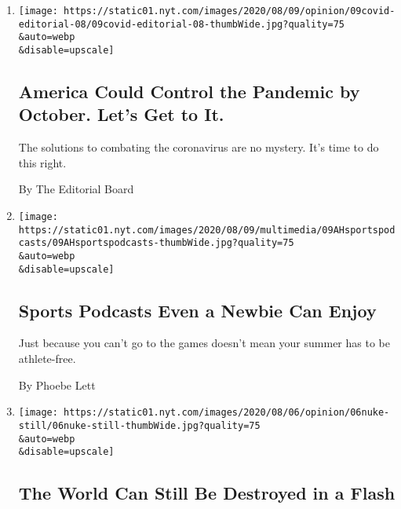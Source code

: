 \begin{enumerate}
\def\labelenumi{\arabic{enumi}.}
\item
  \href{/2020/08/08/opinion/sunday/coronavirus-response-testing-lockdown.html}{}

  \texttt{[image: https://static01.nyt.com/images/2020/08/09/opinion/09covid-editorial-08/09covid-editorial-08-thumbWide.jpg?quality=75\\\&auto=webp\\\&disable=upscale]}

  \hypertarget{america-could-control-the-pandemic-by-october-lets-get-to-it}{%
  \subsection{America Could Control the Pandemic by October. Let's Get
  to
  It.}\label{america-could-control-the-pandemic-by-october-lets-get-to-it}}

  The solutions to combating the coronavirus are no mystery. It's time
  to do this right.

  By The Editorial Board
\item
  \href{/2020/08/08/at-home/coronavirus-sports-podcasts.html}{}

  \texttt{[image: https://static01.nyt.com/images/2020/08/09/multimedia/09AHsportspodcasts/09AHsportspodcasts-thumbWide.jpg?quality=75\\\&auto=webp\\\&disable=upscale]}

  \hypertarget{sports-podcasts-even-a-newbie-can-enjoy}{%
  \subsection{Sports Podcasts Even a Newbie Can
  Enjoy}\label{sports-podcasts-even-a-newbie-can-enjoy}}

  Just because you can't go to the games doesn't mean your summer has to
  be athlete-free.

  By Phoebe Lett
\item
  \href{/2020/08/06/opinion/hiroshima-anniversary-nuclear-weapons.html}{}

  \texttt{[image: https://static01.nyt.com/images/2020/08/06/opinion/06nuke-still/06nuke-still-thumbWide.jpg?quality=75\\\&auto=webp\\\&disable=upscale]}

  \hypertarget{the-world-can-still-be-destroyed-in-a-flash}{%
  \subsection{The World Can Still Be Destroyed in a
  Flash}\label{the-world-can-still-be-destroyed-in-a-flash}}


\end{enumerate}
